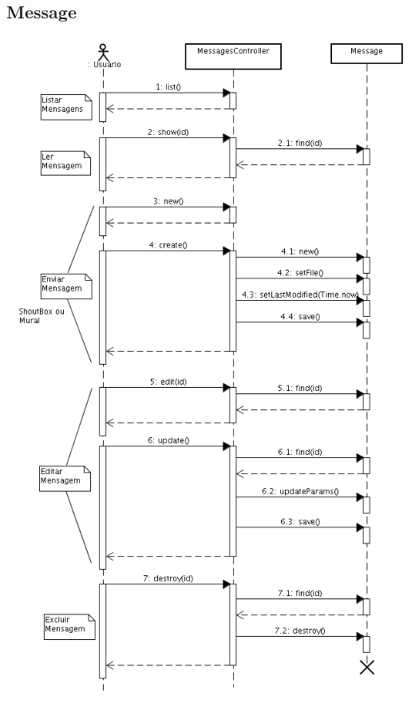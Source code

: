 \documentclass[11pt]{article}
\begin{document}
\subsection{Message}
\includegraphics[width=130truemm]{seq_message.png}
\end{document}
